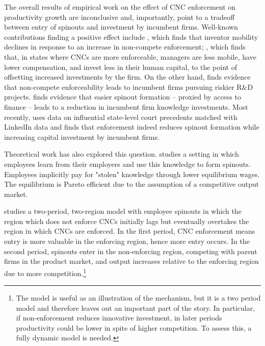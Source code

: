 \documentclass[11pt,english]{article}
\theoremstyle{remark}
\begin{document}
The overall results of empirical work on the effect of CNC enforcement on productivity growth are inconclusive and, importantly, point to a tradeoff between entry of spinouts and investment by incumbent firms. Well-known contributions finding a positive effect include \cite{marx_mobility_2009}, which finds that inventor mobility declines in response to an increase in non-compete enforcement;  \cite{garmaise_ties_2011}, which finds that, in states where CNCs are more enforceable, managers are less mobile, have lower compensation, and invest less in their human capital, to the point of offsetting increased investments by the firm. On the other hand, \cite{conti_non-competition_2014} finds evidence that non-compete enforceability leads to incumbent firms pursuing riskier R\&D projects. \cite{colombo_does_2013} finds evidence that easier spinout formation -- proxied by access to finance -- leads to a reduction in incumbent firm knowledge investments.  Most recently, \cite{jeffers_impact_2018} uses data on influential state-level court precedents matched with LinkedIn data and finds that enforcement indeed reduces spinout formation while increasing capital investment by incumbent firms. 

Theoretical work has also explored this question. \cite{franco_spin-outs:_2006} studies a setting in which employees learn from their employers and use this knowledge to form spinouts. Employees implicitly pay for "stolen" knowledge through lower equilibrium wages. The equilibrium is Pareto efficient due to the assumption of a competitive output market.

\cite{franco_covenants_2008} studies a two-period, two-region model with employee spinouts in which the region which does not enforce CNCs initially lags but eventually overtakes the region in which CNCs are enforced. In the first period, CNC enforcement means entry is more valuable in the enforcing region, hence more entry occurs. In the second period, spinouts enter in the non-enforcing region, competing with parent firms in the product market, and output increases relative to the enforcing region due to more competition.\footnote{The model is useful as an illustration of the mechanism, but it is a two period model and therefore leaves out an important part of the story. In particular, if non-enforcement reduces innovative investment, in later periods productivity could be lower in spite of higher competition. To assess this, a fully dynamic model is needed.}
\end{document}
